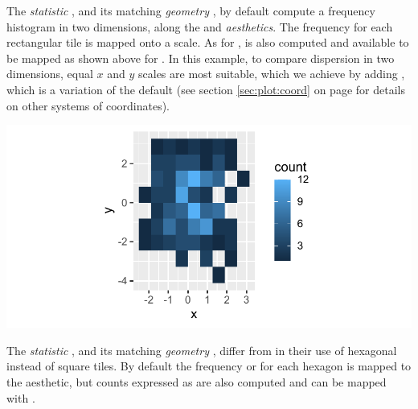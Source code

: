 \documentclass[krantz2]{krantz}\usepackage{knitr}
\begin{document}
The \emph{statistic} , and its matching \emph{geometry} , by default compute a frequency histogram in two dimensions, along the  and  \emph{aesthetics}. The frequency for each rectangular tile is mapped onto a  scale. As for ,  is also computed and available to be mapped as shown above for . In this example, to compare dispersion in two dimensions, equal $x$ and $y$ scales are most suitable, which we achieve by adding , which is a variation of the default   (see section \ref{sec:plot:coord} on page \pageref{sec:plot:coord} for details on other systems of coordinates).

\begin{knitrout}\footnotesize
{}\color{fgcolor}\begin{kframe}
\begin{alltt}
  \hlopt{+}
  \hlstd{(} \hlstd{=} \hlstd{)} \hlopt{+}
  \hlstd{(} \hlstd{=} \hlstd{)}
\end{alltt}
\end{kframe}

{\centering \includegraphics[width=.7\textwidth]{figure/pos-bin2d-plot-01-1}

}



\end{knitrout}

The \emph{statistic} , and its matching \emph{geometry} , differ from  in their use of hexagonal instead of square tiles. By default the frequency or  for each hexagon is mapped to the  aesthetic, but counts expressed as  are also computed and can be mapped with .
\end{document}
